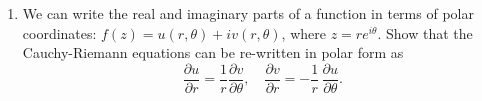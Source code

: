 \documentclass[10pt,a4paper]{article}
\begin{document}
\begin{enumerate}
\item
  We can write the real and imaginary parts of a function in terms of
  polar coordinates: $f(z) = u(r,\theta) + i v(r,\theta)$, where $z =
  re^{i\theta}$.  Show that the Cauchy-Riemann equations can be
  re-written in polar form as
  \begin{equation}
    \frac{\partial u}{\partial r} =  \frac{1}{r} \frac{\partial v}{\partial \theta}, \quad \frac{\partial v}{\partial r} =  - \frac{1}{r}\,  \frac{\partial u}{\partial \theta}.
  \end{equation}
\end{enumerate}
\end{document}
